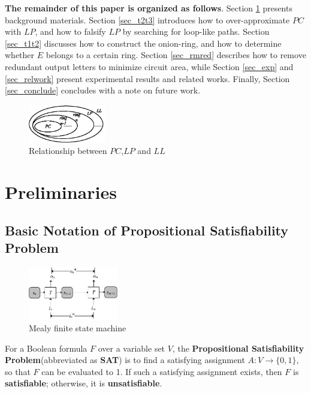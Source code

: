 \documentclass[journal]{IEEEtran}
\begin{document}
\textbf{The remainder of this paper is organized as follows}.
Section \ref{sec_prem} presents background materials.
Section \ref{sec_t2t3} introduces how to over-approximate $PC$ with $LP$,
and how to falsify $LP$ by searching for loop-like paths.
Section \ref{sec_t1t2} discusses how to construct the onion-ring,
and how to determine whether $E$ belongs to a certain ring.
Section \ref{sec_rmred} describes how to remove redundant output letters to minimize circuit area,
while Section \ref{sec_exp} and \ref{sec_relwork} present experimental results and related works.
Finally,
Section \ref{sec_conclude} concludes with a note on future work.
\begin{figure}[b]
\begin{center}
\includegraphics[width=0.3\textwidth]{f123}
\end{center}
\caption{Relationship between $PC$,$LP$ and $LL$}
  \label{f123}
\end{figure}



\section{Preliminaries}\label{sec_prem}

\subsection{Basic Notation of Propositional Satisfiability Problem}\label{subsec_SAT}
\begin{figure}[t]
\begin{center}
\includegraphics[width=0.35\textwidth]{mealy}
\end{center}
\caption{Mealy finite state machine}
  \label{mealy}
\end{figure}

For a Boolean formula $F$ over a variable set $V$,
the \textbf{Propositional Satisfiability Problem}(abbreviated as \textbf{SAT}) is to find a satisfying assignment $A:V\to \{0,1\}$,
so that $F$ can be evaluated to 1.
If such a satisfying assignment exists, then $F$ is \textbf{satisfiable};
otherwise,
it is \textbf{unsatisfiable}.
\end{document}
